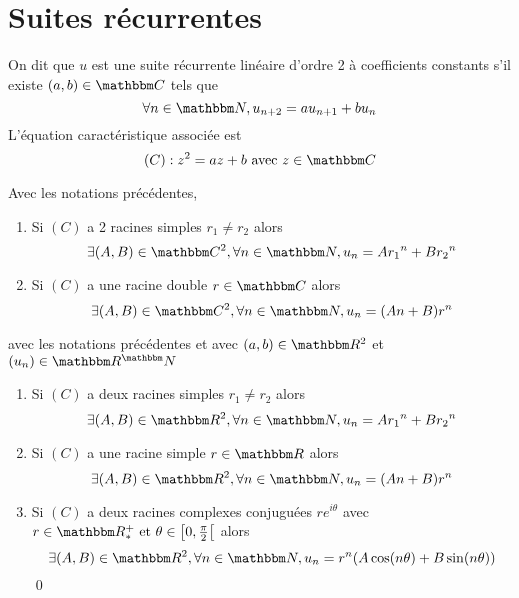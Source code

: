 \part{Suites récurrentes}

\begin{defn}
	On dit que $u$ est une suite récurrente linéaire d'ordre 2 à coefficients constants s'il existe $(a,b)\in \C$ tels que \[
		\forall n \in \N, u_{n+2} = au_{n+1} + bu_n
	\]
	L'équation caractéristique associée est \[
		(C): z^2 = az + b \text{ avec } z \in \C
	\] 
\end{defn}

\begin{prop}
	Avec les notations précédentes,
	\begin{enumerate}
		\item Si $(C)$ a 2 racines simples $r_1\neq r_2$ alors \[
			\exists (A,B)\in \C^2, \forall n\in \N, u_n = A{r_1}^n+B{r_2}^n
			\] 
		\item Si $(C)$ a une racine double $r \in \C$ alors \[
		\exists (A,B)\in \C^2, \forall n \in \N, u_n = (An+B)r^n
		\] 
	\end{enumerate}
\end{prop}

\begin{prv}
\end{prv}

\begin{prop}
	avec les notations précédentes et avec $(a,b)\in \R^2$ et $(u_n)\in \R^\N$\\
	\begin{enumerate}
		\item Si $(C)$ a deux racines simples $r_1 \neq r_2$ alors \[
				\exists (A,B)\in \R^2, \forall n\in \N, u_n = A{r_1}^n + B{r_2}^n
			\]
		\item Si $(C)$ a une racine simple $r \in \R$ alors \[
			\exists (A,B) \in \R^2, \forall n \in \N, u_n = (An+B)r^n
			\]
		\item Si $(C)$ a deux racines complexes conjuguées $re^{i\theta}$ avec $r \in \R^+_* \text{ et } \theta\in \left[0, \frac{\pi}{2} \right[$ alors \[
		\exists (A,B) \in \R^2, \forall n\in \N, u_n = r^n(A\cos(n\theta) + B \sin(n\theta))
		\] \qed
	\end{enumerate}
\end{prop}

